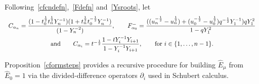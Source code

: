 \documentclass[11pt]{article}
\theoremstyle{plain}
\theoremstyle{definition}
\theoremstyle{remark}
\numberwithin{equation}{section}
\newcounter{r}
\newcounter{s}
\begin{document}
Following~\eqref{cfcndefn},~\eqref{Fdefn} and~\eqref{Ysroots}, let
$$
\begin{array}{c} 
C_{\alpha_n} = \dfrac{(1-t_0^{\frac12}t_n^{\frac12}Y_n^{-1})(1+t_n^{\frac12}t_0^{-\frac12}Y_n^{-1})}{(1-Y_n^{-2})},
\qquad
F^-_{\alpha_0}
= \dfrac{((u_n^{-\frac12}-u_n^{\frac12})
+(u_0^{-\frac12}-u_0^{\frac12}) q^{-\frac12}Y_1^{-1}) qY_1^2 }
{1- q Y_1^2 }\\[10pt]
\hbox{and}\qquad
C_{\alpha_i} = t^{-\frac12}\dfrac{1-tY_i^{-1}Y_{i+1} }{ 1-Y_i^{-1}Y_{i+1} },
\qquad\hbox{for $i\in \{1, \ldots, n-1\}$.}
\end{array}
$$

Proposition~\ref{cformsteps} provides a recursive procedure for building $\widehat{E}_\mu$ from $\widehat{E}_0=1$
via the divided-difference operators $\partial_i$ used in Schubert calculus.
\end{document}
